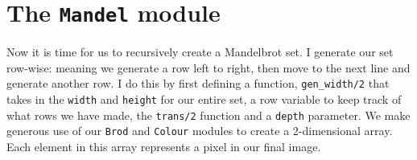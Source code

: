 \section{The \texttt{Mandel} module}
Now it is time for us to recursively create a Mandelbrot set. 
I generate our set row-wise: meaning we generate a row left to right, then move to the next line and generate another row. 
I do this by first defining a function, \texttt{gen\_width/2} that takes in the \texttt{width} and \texttt{height} for our entire set, a row variable to keep track of what rows we have made, the \texttt{trans/2} function and a \texttt{depth} parameter.
We make generous use of our \texttt{Brod} and \texttt{Colour} modules to create a 2-dimensional array. Each element in this array represents a pixel in our final image.


